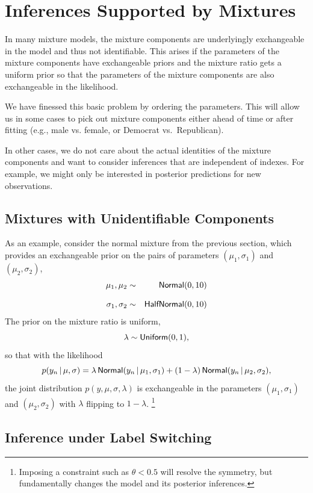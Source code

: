 \section{Inferences Supported by
  Mixtures}\label{mixture-inference.section}

In many mixture models, the mixture components are underlyingly
exchangeable in the model and thus not identifiable.  This arises if
the parameters of the mixture components have exchangeable priors and
the mixture ratio gets a uniform prior so that the parameters of the
mixture components are also exchangeable in the likelihood.  

We have finessed this basic problem by ordering the parameters.  This
will allow us in some cases to pick out mixture components either
ahead of time or after fitting (e.g., male vs. female, or Democrat
vs.\ Republican).  

In other cases, we do not care about the actual identities of the
mixture components and want to consider inferences that are
independent of indexes.  For example, we might only be interested
in posterior predictions for new observations.

\subsection{Mixtures with Unidentifiable Components}

As an example, consider the normal mixture from the previous section,
which provides an exchangeable prior on the pairs of parameters
$(\mu_1, \sigma_1)$ and $(\mu_2, \sigma_2)$,
%
\begin{eqnarray*}
\mu_1, \mu_2 & \sim & \distro{Normal}(0, 10)
\\[8pt]
\sigma_1, \sigma_2 & \sim & \distro{HalfNormal}(0, 10)
\end{eqnarray*}
%
The prior on the mixture ratio is uniform,
%
\[
\lambda \sim \distro{Uniform}(0, 1),
\]
%
so that with the likelihood
%
\[
p(y_n \, | \, \mu, \sigma) 
= \lambda \, \distro{Normal}(y_n \, | \, \mu_1, \sigma_1) 
+ (1 - \lambda) \, \distro{Normal}(y_n \, | \, \mu_2, \sigma_2),
\]
%
the joint distribution $p(y, \mu, \sigma, \lambda)$ is exchangeable
in the parameters $(\mu_1, \sigma_1)$ and $(\mu_2, \sigma_2)$ with
$\lambda$ flipping to $1 - \lambda$.%
%
\footnote{Imposing a constraint such as $\theta < 0.5$ will resolve
  the symmetry, but fundamentally changes the model and its posterior
  inferences.} 

\subsection{Inference under Label Switching}

